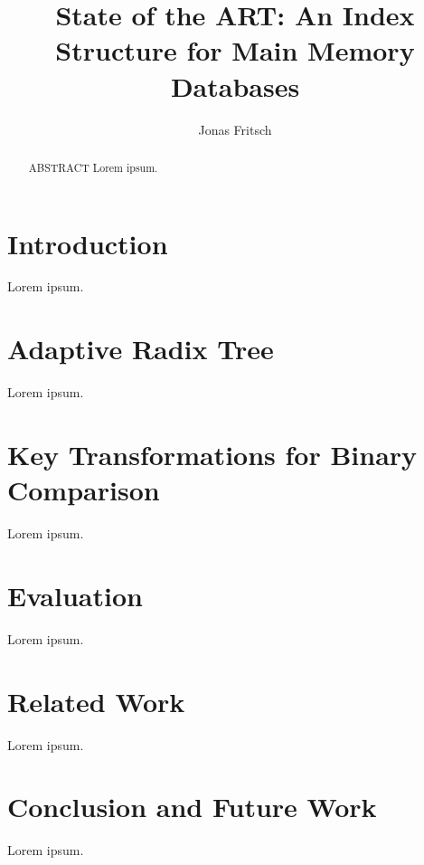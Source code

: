 \documentclass[acmtog,nonacm]{acmart}
\begin{document}
\title{State of the ART: An Index Structure for Main Memory Databases}

\author{Jonas Fritsch}

\begin{abstract}
    ABSTRACT Lorem ipsum.
\end{abstract}

\maketitle

\section{Introduction}
Lorem ipsum.

\section{Adaptive Radix Tree}
Lorem ipsum.

\section{Key Transformations for Binary Comparison}
Lorem ipsum.

\section{Evaluation}
Lorem ipsum.

\section{Related Work}
Lorem ipsum.

\section{Conclusion and Future Work}
Lorem ipsum.
\end{document}
